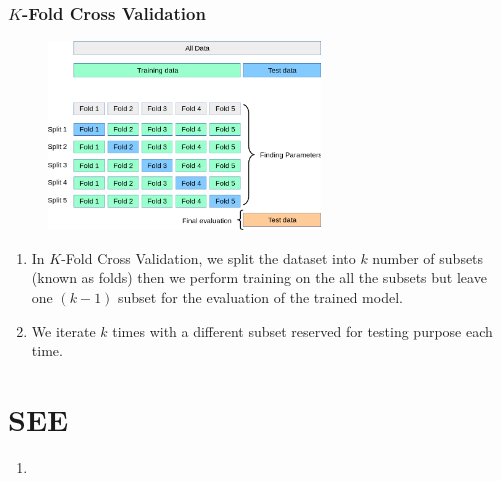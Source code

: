\subsubsection{$K$-Fold Cross Validation \cite{geeksforgeeks/cross-validation-machine-learning/}} \label{Cross-Validation: K-Fold Cross Validation}

\begin{table}[H]
    \begin{minipage}{0.38\linewidth}
        \begin{figure}[H]
            \centering
            \includegraphics[width=\linewidth, height=5cm, keepaspectratio]{Pictures/ai-ml/grid_search_cross_validation.png}
        \end{figure}
    \end{minipage}
    \hfill
    \begin{minipage}{0.58\linewidth}
        \begin{enumerate}
            \item In $K$-Fold Cross Validation, we split the dataset into $k$ number of subsets (known as folds) then we perform training on the all the subsets but leave one $(k-1)$ subset for the evaluation of the trained model. 
            
            \item  We iterate $k$ times with a different subset reserved for testing purpose each time.
        
        \end{enumerate}
    \end{minipage}
\end{table}




\section*{SEE}

\begin{enumerate}
    \item {}
\end{enumerate}








